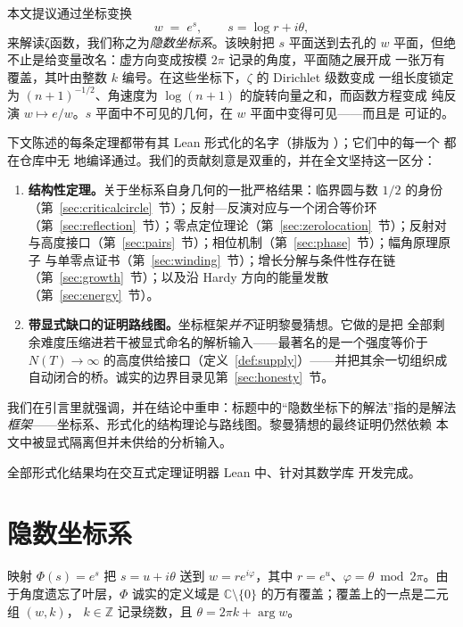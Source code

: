本文提议通过坐标变换
\[
  w \;=\; e^{s}, \qquad s=\log r+i\theta ,
\]
来解读ζ函数，我们称之为\emph{隐数坐标系}。该映射把 $s$ 平面送到去孔的
$w$ 平面，但绝不止是给变量改名：虚方向变成按模 $2\pi$ 记录的角度，平面随之展开成
一张万有覆盖，其叶由整数 $k$ 编号。在这些坐标下，$\zeta$ 的 Dirichlet 级数变成
一组长度锁定为 $(n+1)^{-1/2}$、角速度为 $\log(n+1)$ 的旋转向量之和，而函数方程变成
纯反演 $w\mapsto e/w$。$s$ 平面中不可见的几何，在 $w$ 平面中变得可见——而且是
可证的。

下文陈述的每条定理都带有其 Lean 形式化的名字（排版为 ）；它们中的每一个
都在仓库中无  地编译通过。我们的贡献刻意是双重的，并在全文坚持这一区分：

\begin{enumerate}
\item \textbf{结构性定理。}关于坐标系自身几何的一批严格结果：临界圆与数 $1/2$
的身份（第~\ref{sec:criticalcircle}~节）；反射—反演对应与一个闭合等价环
（第~\ref{sec:reflection}~节）；零点定位理论（第~\ref{sec:zerolocation}~节）；反射对
与高度接口（第~\ref{sec:pairs}~节）；相位机制（第~\ref{sec:phase}~节）；幅角原理原子
与单零点证书（第~\ref{sec:winding}~节）；增长分解与条件性存在链
（第~\ref{sec:growth}~节）；以及沿 Hardy 方向的能量发散
（第~\ref{sec:energy}~节）。
\item \textbf{带显式缺口的证明路线图。}坐标框架\emph{并不}证明黎曼猜想。它做的是把
全部剩余难度压缩进若干被显式命名的解析输入——最著名的是一个强度等价于
$N(T)\to\infty$ 的高度供给接口（定义~\ref{def:supply}）——并把其余一切组织成
自动闭合的桥。诚实的边界目录见第~\ref{sec:honesty}~节。
\end{enumerate}

我们在引言里就强调，并在结论中重申：标题中的“隐数坐标下的解法”指的是解法
\emph{框架}——坐标系、形式化的结构理论与路线图。黎曼猜想的最终证明仍然依赖
本文中被显式隔离但并未供给的分析输入。

全部形式化结果均在交互式定理证明器 Lean \citep{deMoura2015} 中、针对其数学库
\citep{MathlibCommunity2020} 开发完成。

\section{隐数坐标系}\label{sec:coords}

\begin{definition}[隐数坐标]\label{def:coords}
映射 $\Phi(s)=e^{s}$ 把 $s=u+i\theta$ 送到 $w=re^{i\varphi}$，其中
$r=e^{u}$、$\varphi=\theta \bmod 2\pi$。由于角度遗忘了叶层，$\Phi$ 诚实的定义域是
$\mathbb{C}\setminus\{0\}$ 的万有覆盖；覆盖上的一点是二元组 $(w,k)$，
$k\in\mathbb{Z}$ 记录绕数，且 $\theta=2\pi k+\arg w$。
\end{definition}


